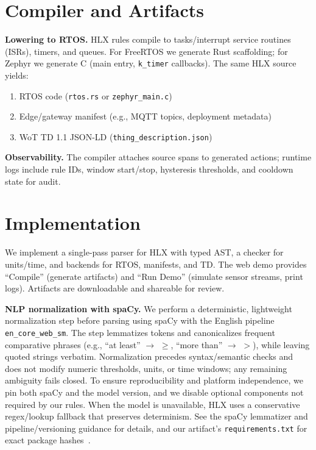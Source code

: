 \documentclass[journal]{IEEEtran}
\begin{document}
\section{Compiler and Artifacts}
\textbf{Lowering to RTOS.} HLX rules compile to tasks/interrupt service routines (ISRs), timers, and queues. For FreeRTOS we generate Rust scaffolding; for Zephyr we generate C (main entry, \texttt{k\_timer} callbacks). The same HLX source yields:
\begin{enumerate}
  \item RTOS code (\texttt{rtos.rs} or \texttt{zephyr\_main.c})
  \item Edge/gateway manifest (e.g., MQTT topics, deployment metadata)
  \item WoT TD 1.1 JSON-LD (\texttt{thing\_description.json})
\end{enumerate}

\noindent \textbf{Observability.} The compiler attaches source spans to generated actions; runtime logs include rule IDs, window start/stop, hysteresis thresholds, and cooldown state for audit.

\section{Implementation}
We implement a single-pass parser for HLX with typed AST, a checker for units/time, and backends for RTOS, manifests, and TD. The web demo provides “Compile” (generate artifacts) and “Run Demo” (simulate sensor streams, print logs). Artifacts are downloadable and shareable for review.

\noindent \textbf{NLP normalization with spaCy.} We perform a deterministic, lightweight normalization step before parsing using spaCy\footnotemark{} with the English pipeline \texttt{en\_core\_web\_sm}. The step lemmatizes tokens and canonicalizes frequent comparative phrases (e.g., ``at least'' $\rightarrow$ $\geq$, ``more than'' $\rightarrow$ $>$), while leaving quoted strings verbatim. Normalization precedes syntax/semantic checks and does not modify numeric thresholds, units, or time windows; any remaining ambiguity fails closed. To ensure reproducibility and platform independence, we pin both spaCy and the model version, and we disable optional components not required by our rules. When the model is unavailable, HLX uses a conservative regex/lookup fallback that preserves determinism. See the spaCy lemmatizer and pipeline/versioning guidance for details, and our artifact’s \texttt{requirements.txt} for exact package hashes~\cite{spacy-lemmatizer,spacy-v3,spacy-models,spacy-101,arr-checklist,spacy-software}.
\end{document}
